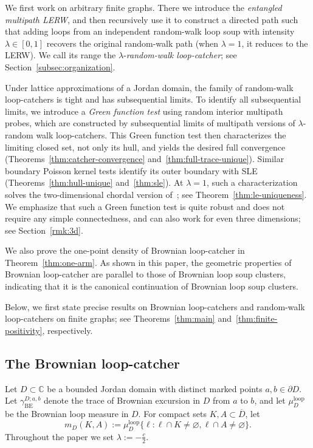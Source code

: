 \documentclass[11pt]{article}
\numberwithin{equation}{section}
\newcommand{\C}{\mathbb{C}}
\newcommand{\1}{\mathbf{1}}
\newcommand{\BE}{\mathrm{BE}}
\begin{document}
We first work on arbitrary finite graphs. There we introduce the \emph{entangled multipath LERW}, and then recursively use it to construct a directed path such that adding loops from an independent random-walk loop soup with intensity $\lambda\in[0,1]$ recovers the original random-walk path (when $\lambda=1$, it reduces to the LERW). We call its range the $\lambda$-\emph{random-walk loop-catcher}; see Section~\ref{subsec:organization}.

Under lattice
approximations of a Jordan domain, the family of random-walk loop-catchers is tight and has subsequential limits. To identify all subsequential limits, we introduce a \emph{Green function test} using random interior multipath probes, which are constructed by subsequential limits of multipath versions of $\lambda$-random walk loop-catchers.
This Green function test then characterizes the limiting closed set, not only its hull, and yields the desired full convergence (Theorems~\ref{thm:catcher-convergence} and~\ref{thm:full-trace-unique}). Similar boundary Poisson kernel tests
identify its outer boundary with SLE (Theorems~\ref{thm:hull-unique} and~\ref{thm:sle}).  At $\lambda=1$, such a characterization solves the
two-dimensional chordal version of~\cite[Conjecture~1.3]{SS18}; see
Theorem~\ref{thm:le-uniqueness}. We emphasize that such a Green function test is quite robust and does not require any simple connectedness, and can also work for even three dimensions; see Section~\ref{rmk:3d}.

We also prove the one-point density of Brownian loop-catcher in Theorem~\ref{thm:one-arm}. As shown in this paper, the geometric properties of Brownian loop-catcher are parallel to those of Brownian loop soup clusters, indicating that it is the canonical continuation of Brownian loop soup clusters.


Below, we first state precise results on Brownian loop-catchers and random-walk loop-catchers on finite graphs; see Theorems~\ref{thm:main} and~\ref{thm:finite-positivity}, respectively.

\subsection{The Brownian loop-catcher}\label{subsec:continuum-main}

Let \(D\subset\C\) be a bounded
Jordan domain with distinct marked points \(a,b\in\partial D\).  Let \(\gamma_{\BE}^{D;a,b}\) denote the trace of Brownian excursion
in \(D\) from \(a\) to \(b\), and let \(\mu_D^{\mathrm{loop}}\) be the Brownian
loop measure in \(D\).  For compact sets \(K,A\subset\overline D\), let
\begin{equation}
 m_D(K,A)
 :=\mu_D^{\mathrm{loop}}\{\ell:\ell\cap K\ne\varnothing,
        \ell\cap A\ne\varnothing\}.
\end{equation}
Throughout the paper we set $\lambda:=-\frac{c}{2}$.
\end{document}

